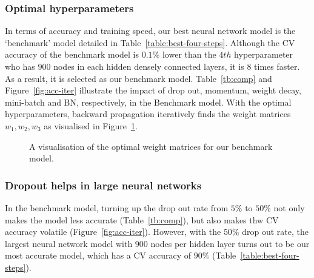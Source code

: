 \subsubsection{Optimal hyperparameters}
In terms of accuracy and training speed, our best neural network model is the `benchmark' model detailed in Table~\ref{table:best-four-steps}. Although the CV accuracy of the benchmark model is $0.1\%$ lower than the $4th$ hyperparameter who has $900$ nodes in each hidden densely connected layers, it is $8$ times faster. As a result, it is selected as our benchmark model. Table~\ref{tb:comp} and Figure~\ref{fig:acc-iter} illustrate the impact of drop out, momentum, weight decay, mini-batch and BN, respectively, in the Benchmark model. With the optimal hyperparameters, backward propagation iteratively finds the weight matrices~$w_1,w_2,w_3$ as visualised in Figure~\ref{fig:weight}.
\begin{figure}
    \caption{\label{fig:weight} A visualisation of the optimal weight matrices for our benchmark model.}
\end{figure}

\subsubsection{Dropout helps in large neural networks}
In the benchmark model, turning up the drop out rate from $5\%$ to $50\%$ not only makes the model less accurate (Table~\ref{tb:comp}), but also makes thw CV accuracy volatile (Figure~\ref{fig:acc-iter}). However, with the $50\%$ drop out rate, the largest neural network model with $900$ nodes per hidden layer turns out to be our most accurate model, which has a CV accuracy of $90\%$ (Table~\ref{table:best-four-steps}). 

